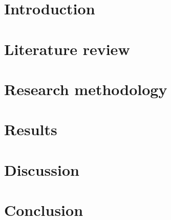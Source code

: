 \documentclass[pdftex,10pt,a4paper,oneside]{article}
\numberwithin{equation}{section}
\begin{document}

\newpage

\newpage

\newpage

\newpage

\newpage

\newpage

\newpage

\section{Introduction}\label{sec:1-introduction}




\newpage

\section{Literature review}\label{sec:2-literature-review}






\newpage

\section{Research methodology}\label{sec:3-research-methodology}

\newpage

\section{Results}\label{sec:4-results}
\newpage

\section{Discussion}\label{sec:5-discussion}
\newpage

\section{Conclusion}\label{sec:6-conclusion}
\newpage



\newpage


\end{document}

